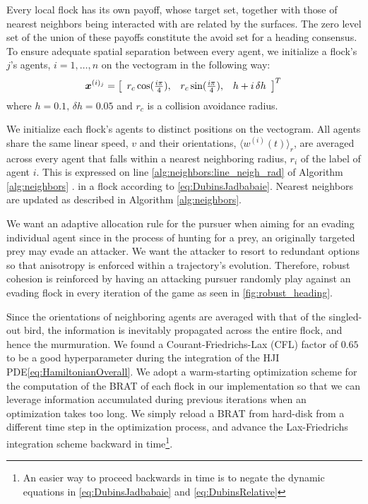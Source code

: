 
Every local flock has its own payoff, whose target set, together with those of nearest neighbors being interacted with are related by the surfaces. The zero level set of the union of these payoffs constitute the avoid set for a heading consensus. To ensure adequate spatial separation between every agent, we initialize a flock's $j$'s agents, $i=1,\ldots, n$ on the vectogram in the following way:
%
\begin{align}
	\state^{(i)_j} = \left[\begin{array}{ccc}
		r_c \cos (\frac{i\pi}{4}), & 	r_c \sin (\frac{i\pi}{4}), & h+i\,\delta h
	\end{array}\right]^T \, %
\end{align}
%
where $h=0.1, \, \delta h = 0.05$ and $r_c$ is a collision avoidance radius.

We initialize each flock's agents to distinct positions on the vectogram. All agents share the same linear speed, $v$ and their orientations, $\langle w^{(i)} (t) \rangle_r$, are averaged  across every agent that falls within a nearest neighboring radius, $r_i$ of the label of agent $i$. This is expressed on line \ref{alg:neighbors:line_neigh_rad} of Algorithm \ref{alg:neighbors} . in a flock according to \eqref{eq:DubinsJadbabaie}. Nearest neighbors are updated as described in Algorithm \ref{alg:neighbors}. 

We want an adaptive allocation rule for the pursuer when aiming for an evading individual agent since in the process of hunting for a prey, an originally targeted prey may evade an attacker. We want the attacker to resort to redundant options so that anisotropy is enforced within a trajectory's evolution. Therefore, robust cohesion is reinforced by having an attacking  pursuer randomly play against an evading flock in every iteration of the game as seen in \autoref{fig:robust_heading}. 


Since the orientations of neighboring agents are averaged with that of the singled-out bird, the information is inevitably propagated across the entire flock, and hence the murmuration.
 We found a Courant-Friedrichs-Lax (CFL) factor of $0.65$ to be a good hyperparameter during the integration of the HJI PDE\eqref{eq:HamiltonianOverall}. We adopt a warm-starting optimization scheme for the computation of the BRAT of each flock in our implementation so that we can leverage information accumulated during previous iterations when an optimization takes too long. We simply reload a BRAT from hard-disk from a different time step in the optimization process, and advance the Lax-Friedrichs integration scheme backward in time\footnote{An easier way to proceed backwards in time is to negate the dynamic equations in \eqref{eq:DubinsJadbabaie} and \eqref{eq:DubinsRelative}}.
